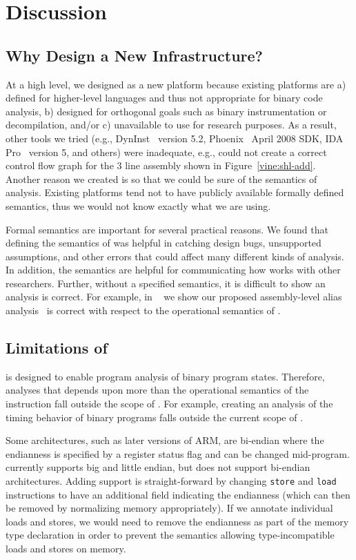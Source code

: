 \section{Discussion}
\label{vine:discussion}

\subsection{Why Design a New Infrastructure?}  

At a high level, we designed \bap as a new platform because existing
platforms are a) defined for higher-level languages and thus not
appropriate for binary code analysis, b) designed for orthogonal goals
such as binary instrumentation or decompilation, and/or c) unavailable
to use for research purposes.  As a result, other tools we tried
(e.g., DynInst~\cite{dyninst} version 5.2, Phoenix~\cite{phoenix}
April 2008 SDK, IDA Pro~\cite{idapro} version 5, and others) were
inadequate, e.g., could not create a correct control flow graph for
the 3 line assembly shown in Figure~\ref{vine:shl-add}. Another reason
we created \bap is so that we could be sure of the semantics of 
analysis. Existing platforms tend not to have publicly available
formally defined semantics, thus we would not know exactly what we are
using.

Formal semantics are important for several practical reasons. We found
that defining the semantics of \bap was helpful in catching design
bugs, unsupported assumptions, and other errors that could affect many
different kinds of analysis. In addition, the semantics are helpful
for communicating how \bap works with other researchers.  Further,
without a specified semantics, it is difficult to show an analysis is
correct. For example, in ~\cite{brumley:2006:alias} we show our
proposed assembly-level alias analysis~\cite{brumley:2006:alias} is
correct with respect to the operational semantics of \bap.


\subsection{Limitations of \bap} 

\bap is designed to enable program analysis of binary program
states. Therefore, analyses that depends upon more than the
operational semantics of the instruction fall outside the scope of
\bap. For example, creating an analysis of the timing behavior of
binary programs falls outside the current scope of \bap.

Some architectures, such as later versions of ARM, are bi-endian where
the endianness is specified by a register status flag and can be
changed mid-program. \bap currently supports big and little endian,
but does not support bi-endian architectures. Adding support is
straight-forward by changing {\tt store} and {\tt load} instructions
to have an additional field indicating the endianness (which can then
be removed by normalizing memory appropriately).  If we annotate
individual loads and stores, we would need to remove the endianness as
part of the memory type declaration in order to prevent the semantics
allowing type-incompatible loads and stores on memory.

